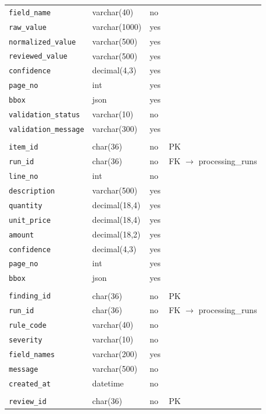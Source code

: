 \documentclass[11pt,a4paper]{report}
\begin{document}
{\begin{longtable}{L{4.2cm}L{3.4cm}L{1.1cm}L{5.0cm}}
\texttt{field\_name} & varchar(40) & no & \\
\texttt{raw\_value} & varchar(1000) & yes & \\
\texttt{normalized\_value} & varchar(500) & yes & \\
\texttt{reviewed\_value} & varchar(500) & yes & \\
\texttt{confidence} & decimal(4,3) & yes & \\
\texttt{page\_no} & int & yes & \\
\texttt{bbox} & json & yes & \\
\texttt{validation\_status} & varchar(10) & no & \\
\texttt{validation\_message} & varchar(300) & yes & \\
\\
\texttt{item\_id} & char(36) & no & PK\\
\texttt{run\_id} & char(36) & no & FK $\rightarrow$ processing\_runs\\
\texttt{line\_no} & int & no & \\
\texttt{description} & varchar(500) & yes & \\
\texttt{quantity} & decimal(18,4) & yes & \\
\texttt{unit\_price} & decimal(18,4) & yes & \\
\texttt{amount} & decimal(18,2) & yes & \\
\texttt{confidence} & decimal(4,3) & yes & \\
\texttt{page\_no} & int & yes & \\
\texttt{bbox} & json & yes & \\
\\
\texttt{finding\_id} & char(36) & no & PK\\
\texttt{run\_id} & char(36) & no & FK $\rightarrow$ processing\_runs\\
\texttt{rule\_code} & varchar(40) & no & \\
\texttt{severity} & varchar(10) & no & \\
\texttt{field\_names} & varchar(200) & yes & \\
\texttt{message} & varchar(500) & no & \\
\texttt{created\_at} & datetime & no & \\
\\
\texttt{review\_id} & char(36) & no & PK\\

\end{longtable}}
\end{document}
